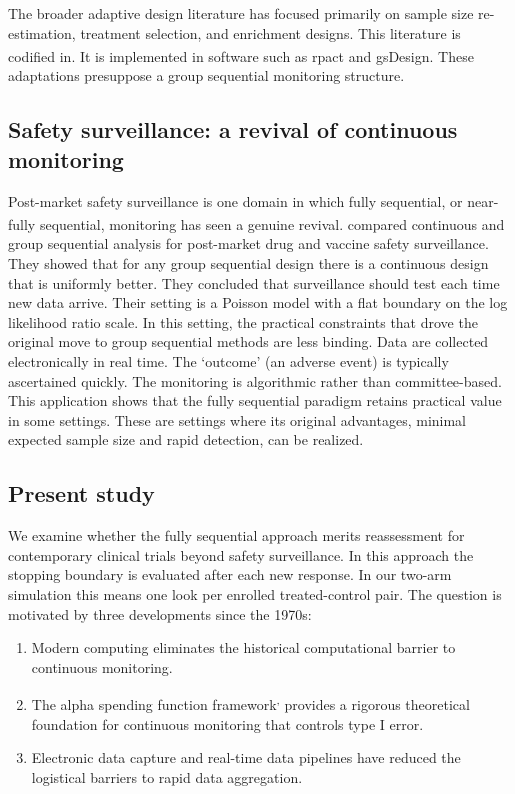 \documentclass[
  11pt,
]{article}
\providecommand{\tightlist}{%
  \setlength{\itemsep}{0pt}\setlength{\parskip}{0pt}}
\begin{document}
The broader adaptive design literature has focused
primarily on sample size re-estimation, treatment
selection, and enrichment designs. This literature is
codified in\textsuperscript{}. It is implemented in
software such as rpact\textsuperscript{} and gsDesign\textsuperscript{}. These adaptations presuppose a
group sequential monitoring structure.

\subsection{Safety surveillance: a revival of continuous monitoring}\label{safety-surveillance-a-revival-of-continuous-monitoring}

Post-market safety surveillance is one domain in which
fully sequential, or near-fully sequential, monitoring
has seen a genuine revival.\textsuperscript{}
compared continuous and group sequential analysis for
post-market drug and vaccine safety surveillance. They
showed that for any group sequential design there is a
continuous design that is uniformly better. They
concluded that surveillance should test each time new
data arrive. Their setting is a Poisson model with a
flat boundary on the log likelihood ratio scale. In
this setting, the
practical constraints that drove the original move to
group sequential methods are less binding. Data are
collected electronically in real time. The `outcome'
(an adverse event) is typically ascertained quickly.
The monitoring is algorithmic rather than
committee-based. This application shows that the fully
sequential paradigm retains practical value in some
settings. These are settings where its original
advantages, minimal expected sample size and rapid
detection, can be realized.

\subsection{Present study}\label{present-study}

We examine whether the fully sequential approach merits
reassessment for contemporary clinical trials beyond
safety surveillance. In this approach the stopping
boundary is evaluated after each new response. In our
two-arm simulation this means one look per enrolled
treated-control pair. The question is motivated by
three developments since the 1970s:

\begin{enumerate}
\def\labelenumi{\arabic{enumi}.}
\tightlist
\item
  Modern computing eliminates the historical
  computational barrier to continuous monitoring.
\item
  The alpha spending function framework\textsuperscript{,}
  provides a rigorous theoretical foundation for
  continuous monitoring that controls type I error.
\item
  Electronic data capture and real-time data
  pipelines have reduced the logistical barriers
  to rapid data aggregation.
\end{enumerate}
\end{document}
